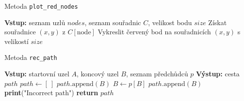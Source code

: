 \begin{algorithm}
    \caption{Metoda \texttt{plot\_red\_nodes}}
    \begin{algorithmic}[1]
        \STATE \textbf{Vstup:} seznam uzlů $nodes$, seznam souřadnic $C$, velikost bodu $size$
                \STATE Získat souřadnice $(x, y)$ z $C[\text{node}]$
                \STATE Vykreslit červený bod na souřadnicích $(x, y)$ s velikostí $size$
            \ENDIF
        \ENDFOR
    \end{algorithmic}
\end{algorithm}
\newpage
\begin{algorithm}
    \caption{Metoda \texttt{rec\_path}}
        \begin{algorithmic}[1]
        \STATE \textbf{Vstup:} startovní uzel $A$, koncový uzel $B$, seznam předchůdců $p$
        \STATE \textbf{Výstup:} cesta $path$
        \STATE $path \gets [~]$
            \STATE $path.\text{append}(B)$
            \STATE $B \gets p[B]$
        \ENDWHILE
        \STATE $path.\text{append}(B)$
            \STATE \textbf{print}("Incorrect path")
        \ENDIF
        \STATE \textbf{return} $path$
    \end{algorithmic}
\end{algorithm}
